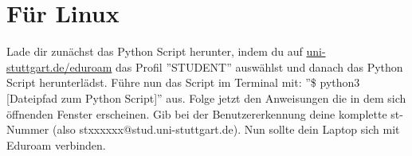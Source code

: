\section*{Für Linux}
Lade dir zunächst das Python Script herunter, indem du auf \href{\eduroamurllinux}{uni-stuttgart.de/eduroam} das Profil ''STUDENT'' auswählst und danach das Python Script herunterlädst.\newline
Führe nun das Script im Terminal mit: ''\$ python3 [Dateipfad zum Python Script]'' aus. Folge jetzt den Anweisungen die in dem sich öffnenden Fenster erscheinen. Gib bei der Benutzererkennung deine komplette st-Nummer (also stxxxxxx@stud.uni-stuttgart.de).\newline
Nun sollte dein Laptop sich mit Eduroam verbinden.